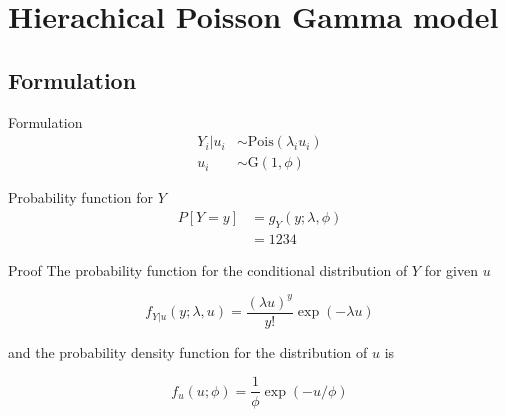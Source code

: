 \documentclass[aspectratio=169]{beamer}
\begin{document}
\hypertarget{hierachical-poisson-gamma-model}{%
\section{Hierachical Poisson Gamma
model}\label{hierachical-poisson-gamma-model}}

\hypertarget{formulation}{%
\subsection{Formulation}\label{formulation}}

\begin{frame}{Formulation}
\begin{subequations}
  \begin{alignat}{2}
    Y_{i}|u_{i} &\sim \mathrm{Pois} (\lambda_{i} u_{i}) \label{eq:pois_g0} \\ 
    u_{i} &\sim \mathrm{G}(1,\phi) \label{eq:pois_g1}
  \end{alignat}
\end{subequations}
\end{frame}

\begin{frame}{Probability function for \(Y\)}
\protect\hypertarget{probability-function-for-y}{}
\begin{equation}
  \begin{aligned}
    P[Y=y]&=g_{Y}(y;\lambda, \phi) \\
    &=1234
  \end{aligned}
\end{equation}
\end{frame}

\begin{frame}{Proof}
\protect\hypertarget{proof}{}
The probability function for the conditional distribution of \(Y\) for
given \(u\)

\begin{equation} \label{eq:pdfPois}
  f_{Y|u}(y;\lambda, u)=\frac{(\lambda u)^y}{y!} \exp (-\lambda u)
\end{equation}

and the probability density function for the distribution of \(u\) is

\begin{equation} \label{eq:pdfGamma}
  f_{u}(u;\phi)=\frac{1}{\phi} \exp (-u/\phi)
\end{equation}
\end{frame}
\end{document}
